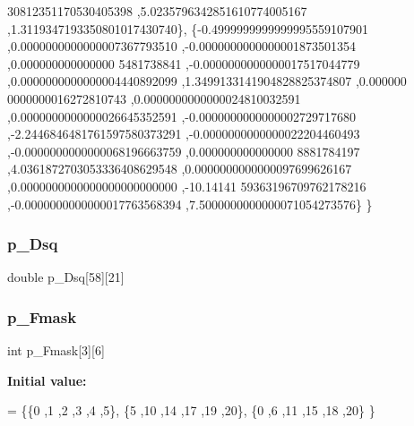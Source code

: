 \begin{DoxyCode}
      30812351170530405398 ,5.0235796342851610774005167 ,1.3119347193350801017430740\},
\{-0.4999999999999995559107901 ,0.0000000000000007367793510 ,-0.0000000000000001873501354 ,0.000000000000000
      5481738841 ,-0.0000000000000017517044779 ,0.0000000000000004440892099 ,1.3499133141904828825374807 ,0.000000
      0000000016272810743 ,0.0000000000000024810032591 ,0.0000000000000026645352591 ,-0.0000000000000002729717680 
      ,-2.2446846481761597580373291 ,-0.0000000000000022204460493 ,-0.0000000000000068196663759 ,0.000000000000000
      8881784197 ,4.0361872703053336408629548 ,0.0000000000000097699626167 ,0.0000000000000000000000000 ,-10.14141
      59363196709762178216 ,-0.0000000000000017763568394 ,7.5000000000000071054273576\}
\}
\end{DoxyCode}
\mbox{\label{a00458_a42684cd4cde19a578beed024a8e587d7}} 
\subsubsection{\texorpdfstring{p\+\_\+\+Dsq}{p\_Dsq}}
{\footnotesize\ttfamily double p\+\_\+\+Dsq\mbox{[}58\mbox{]}\mbox{[}21\mbox{]}}

\mbox{\label{a00458_a7556b1136ab46bbbbfda80a1ffcff11f}} 
\subsubsection{\texorpdfstring{p\+\_\+\+Fmask}{p\_Fmask}}
{\footnotesize\ttfamily int p\+\_\+\+Fmask\mbox{[}3\mbox{]}\mbox{[}6\mbox{]}}

{\bfseries Initial value\+:}
\begin{DoxyCode}
= \{\{0 ,1 ,2 ,3 ,4 ,5\},
\{5 ,10 ,14 ,17 ,19 ,20\},
\{0 ,6 ,11 ,15 ,18 ,20\}
\}
\end{DoxyCode}
\mbox{\label{a00458_a240743866e0fdfc2ade414eedd98fde2}} 
